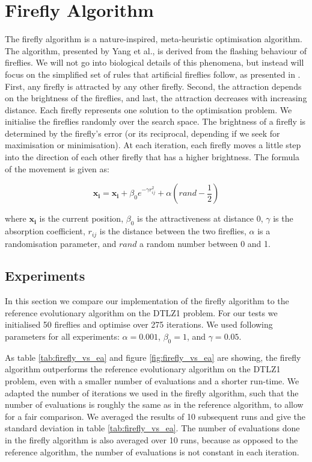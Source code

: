 \section{Firefly Algorithm}

The firefly algorithm is a nature-inspired, meta-heuristic optimisation
algorithm. The algorithm, presented by Yang et al., is derived from the
flashing behaviour of fireflies. We will not go into biological details of this
phenomena, but instead will focus on the simplified set of rules that
artificial fireflies follow, as presented in \cite{firefly}. First, any firefly
is attracted by any other firefly. Second, the attraction depends on the
brightness of the fireflies, and last, the attraction decreases with increasing
distance.  Each firefly represents one solution to the optimisation problem. We
initialise the fireflies randomly over the search space. The brightness of a
firefly is determined by the firefly's error (or its reciprocal, depending if
we seek for maximisation or minimisation). At each iteration, each firefly
moves a little step into the direction of each other firefly that has a higher
brightness. The formula of the movement is given as:

\begin{equation}
    \mathbf{x_i} = \mathbf{x_i} + \beta_0 e^{-\gamma r_{ij}^2} + \alpha (rand - \frac{1}{2})
\end{equation}

where $\mathbf{x_i}$ is the current position, $\beta_0$ is the attractiveness
at distance 0, $\gamma$ is the absorption coefficient, $r_{ij}$ is the distance
between the two fireflies, $\alpha$ is a randomisation parameter, and $rand$ a
random number between 0 and 1.

\subsection{Experiments}

In this section we compare our implementation of the firefly algorithm to the
reference evolutionary algorithm on the DTLZ1 problem. For our tests we initialised 50 fireflies and
optimise over 275 iterations. We used following parameters for all experiments:
$\alpha = 0.001$, $\beta_0 = 1$, and $\gamma = 0.05$.

As table \ref{tab:firefly_vs_ea} and figure \ref{fig:firefly_vs_ea} are
showing, the firefly algorithm outperforms the reference evolutionary algorithm
on the DTLZ1 problem, even with a smaller number of evaluations and a shorter
run-time. We adapted the number of iterations we used in the firefly algorithm,
such that the number of evaluations is roughly the same as in the reference
algorithm, to allow for a fair comparison. We averaged the results of 10
subsequent runs and give the standard deviation in table
\ref{tab:firefly_vs_ea}. The number of evaluations done in the firefly
algorithm is also averaged over 10 runs, because as opposed to the reference
algorithm, the number of evaluations is not constant in each iteration.

